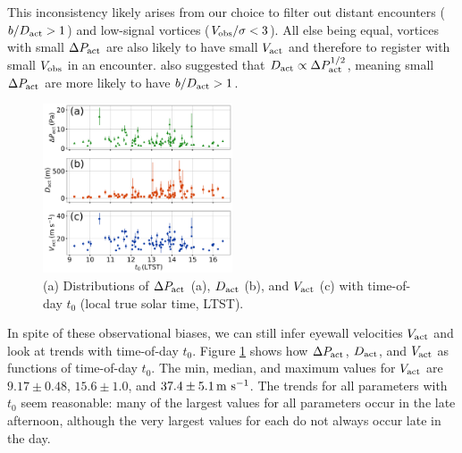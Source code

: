 \documentclass[linenumbers,trackchanges]{aastex63}
\begin{document}
This inconsistency likely arises from our choice to filter out distant encounters ($b/D_{\rm act} > 1$) and low-signal vortices ($V_{\rm obs}/\sigma < 3$). All else being equal, vortices with small $\Delta P_{\rm act}$ are also likely to have small $V_{\rm act}$ and therefore to register with small $V_{\rm obs}$ in an encounter. \citet{2020Icar..33813523J} also suggested that $D_{\rm act} \propto \Delta P_{\rm act}^{1/2}$, meaning small $\Delta P_{\rm act}$ are more likely to have $b/D_{\rm act} > 1$. 

\begin{figure}
    \centering
    \includegraphics[width=0.5\textwidth]{figures/all_actual_values_vs_t0.png}
    \caption{(a) Distributions of $\Delta P_{\rm act}$ (a), $D_{\rm act}$ (b), and $V_{\rm act}$ (c) with time-of-day $t_0$ (local true solar time, LTST).}
    \label{fig:all_actual_values_vs_t0}
\end{figure}

In spite of these observational biases, we can still infer eyewall velocities $V_{\rm act}$ and look at trends with time-of-day $t_0$. Figure \ref{fig:all_actual_values_vs_t0} shows how $\Delta P_{\rm act}$, $D_{\rm act}$, and $V_{\rm act}$ as functions of time-of-day $t_0$. The min, median, and maximum values for $V_{\rm act}$ are $9.17\pm0.48$, $15.6\pm1.0$, and $37.4\pm5.1\,{\rm m\ s^{-1}}$. The trends for all parameters with $t_0$ seem reasonable: many of the largest values for all parameters occur in the late afternoon, although the very largest values for each do not always occur late in the day. 
\end{document}
